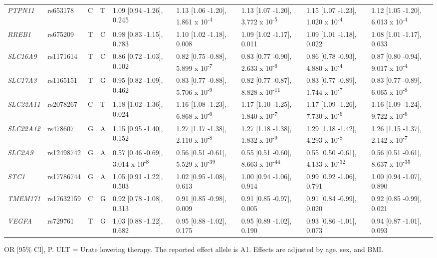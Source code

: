 \documentclass[]{report}
\begin{document}
\begin{landscape}
\begin{table}[!h]
{\begin{threeparttable}
\begin{tabular}[t]{lllllllll}
\em{PTPN11} & rs653178 & C & T & 1.09 [0.94 -1.26], 0.245 & 1.13 [1.06 -1.20], 1.861 x 10\textsuperscript{-4} & 1.13 [1.07 -1.20], 3.772 x 10\textsuperscript{-5} & 1.15 [1.07 -1.23], 1.020 x 10\textsuperscript{-4} & 1.12 [1.05 -1.20], 6.013 x 10\textsuperscript{-4}\\
\em{RREB1} & rs675209 & T & C & 0.98 [0.83 -1.15], 0.783 & 1.10 [1.02 -1.18], 0.008 & 1.09 [1.02 -1.17], 0.011 & 1.09 [1.01 -1.18], 0.022 & 1.08 [1.01 -1.17], 0.033\\
\em{SLC16A9} & rs1171614 & T & C & 0.86 [0.72 -1.03], 0.102 & 0.82 [0.75 -0.88], 5.899 x 10\textsuperscript{-7} & 0.83 [0.77 -0.90], 2.633 x 10\textsuperscript{-6} & 0.86 [0.78 -0.93], 4.880 x 10\textsuperscript{-4} & 0.87 [0.80 -0.94], 9.017 x 10\textsuperscript{-4}\\
\em{SLC17A3} & rs1165151 & T & G & 0.95 [0.82 -1.09], 0.462 & 0.83 [0.77 -0.88], 5.706 x 10\textsuperscript{-9} & 0.82 [0.77 -0.87], 8.828 x 10\textsuperscript{-11} & 0.83 [0.77 -0.89], 1.744 x 10\textsuperscript{-7} & 0.83 [0.77 -0.89], 6.065 x 10\textsuperscript{-8}\\
\em{SLC22A11} & rs2078267 & C & T & 1.18 [1.02 -1.36], 0.024 & 1.16 [1.08 -1.23], 6.868 x 10\textsuperscript{-6} & 1.17 [1.10 -1.25], 1.840 x 10\textsuperscript{-7} & 1.17 [1.09 -1.26], 7.730 x 10\textsuperscript{-6} & 1.16 [1.09 -1.24], 9.722 x 10\textsuperscript{-6}\\
\em{SLC22A12} & rs478607 & G & A & 1.15 [0.95 -1.40], 0.152 & 1.27 [1.17 -1.38], 2.110 x 10\textsuperscript{-8} & 1.27 [1.18 -1.38], 1.832 x 10\textsuperscript{-9} & 1.29 [1.18 -1.42], 4.293 x 10\textsuperscript{-8} & 1.26 [1.15 -1.37], 2.142 x 10\textsuperscript{-7}\\
\em{SLC2A9} & rs12498742 & G & A & 0.57 [0.46 -0.69], 3.014 x 10\textsuperscript{-8} & 0.56 [0.51 -0.61], 5.529 x 10\textsuperscript{-39} & 0.55 [0.51 -0.60], 8.663 x 10\textsuperscript{-44} & 0.55 [0.50 -0.61], 4.133 x 10\textsuperscript{-32} & 0.56 [0.51 -0.61], 8.637 x 10\textsuperscript{-35}\\
\em{STC1} & rs17786744 & G & A & 1.05 [0.91 -1.22], 0.503 & 1.02 [0.95 -1.08], 0.613 & 1.00 [0.94 -1.06], 0.914 & 0.99 [0.92 -1.06], 0.791 & 1.00 [0.94 -1.07], 0.890\\
\em{TMEM171} & rs17632159 & C & G & 0.92 [0.78 -1.08], 0.313 & 0.91 [0.85 -0.98], 0.009 & 0.91 [0.85 -0.97], 0.005 & 0.91 [0.84 -0.99], 0.020 & 0.92 [0.85 -0.99], 0.021\\
\em{VEGFA} & rs729761 & T & G & 1.03 [0.88 -1.22], 0.682 & 0.95 [0.88 -1.02], 0.175 & 0.95 [0.89 -1.02], 0.190 & 0.93 [0.86 -1.01], 0.073 & 0.94 [0.87 -1.01], 0.093\\
\bottomrule
\end{tabular}
\begin{tablenotes}
\item OR [95\% CI], P. ULT = Urate lowering therapy. The reported effect allele is A1. Effects are adjusted by age, sex, and BMI.
\end{tablenotes}
\end{threeparttable}}
\end{table}
\end{landscape}
\end{document}
